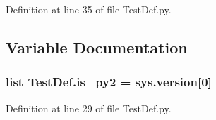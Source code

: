 Definition at line 35 of file Test\-Def.\-py.



\subsection{Variable Documentation}
\hypertarget{namespace_test_def_a4e87724b7a6a117c2cca22c557936868}{
\subsubsection[{is\-\_\-py2}]{\setlength{\rightskip}{0pt plus 5cm}list Test\-Def.\-is\-\_\-py2 = sys.\-version\mbox{[}0\mbox{]}}}\label{namespace_test_def_a4e87724b7a6a117c2cca22c557936868}


Definition at line 29 of file Test\-Def.\-py.

